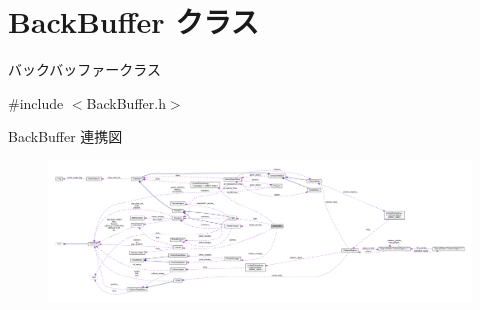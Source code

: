 \hypertarget{class_back_buffer}{}\section{Back\+Buffer クラス}
\label{class_back_buffer}


バックバッファークラス  




{\ttfamily \#include $<$Back\+Buffer.\+h$>$}



Back\+Buffer 連携図\nopagebreak
\begin{figure}[H]
\begin{center}
\leavevmode
\includegraphics[width=350pt]{class_back_buffer__coll__graph}
\end{center}
\end{figure}
